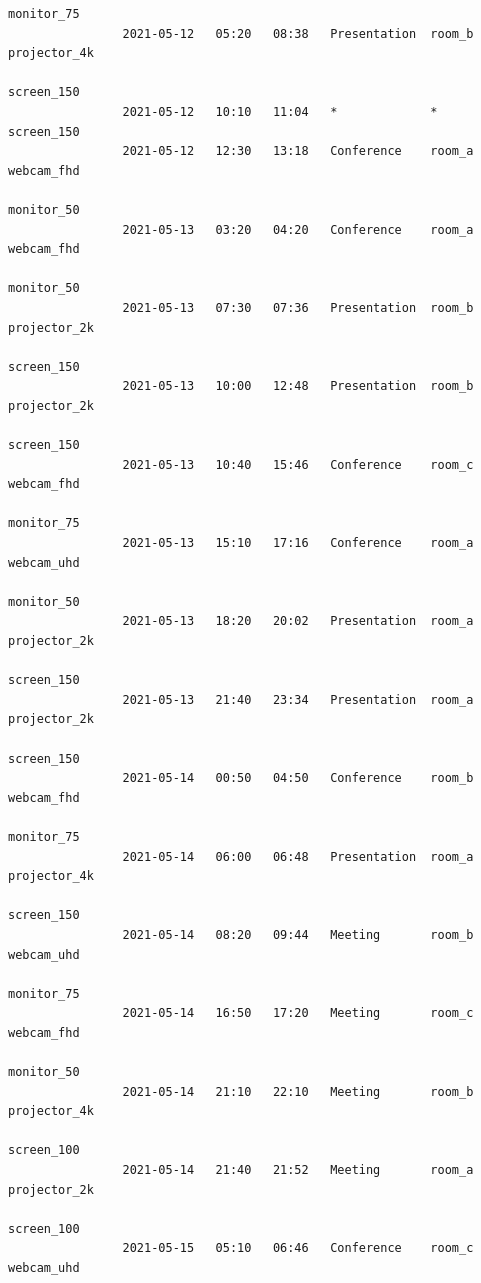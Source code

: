 \documentclass{article}
\begin{document}
\begin{Verbatim}[gobble=8]
                                                                    monitor_75
                2021-05-12   05:20   08:38   Presentation  room_b   projector_4k
                                                                    screen_150
                2021-05-12   10:10   11:04   *             *        screen_150
                2021-05-12   12:30   13:18   Conference    room_a   webcam_fhd
                                                                    monitor_50
                2021-05-13   03:20   04:20   Conference    room_a   webcam_fhd
                                                                    monitor_50
                2021-05-13   07:30   07:36   Presentation  room_b   projector_2k
                                                                    screen_150
                2021-05-13   10:00   12:48   Presentation  room_b   projector_2k
                                                                    screen_150
                2021-05-13   10:40   15:46   Conference    room_c   webcam_fhd
                                                                    monitor_75
                2021-05-13   15:10   17:16   Conference    room_a   webcam_uhd
                                                                    monitor_50
                2021-05-13   18:20   20:02   Presentation  room_a   projector_2k
                                                                    screen_150
                2021-05-13   21:40   23:34   Presentation  room_a   projector_2k
                                                                    screen_150
                2021-05-14   00:50   04:50   Conference    room_b   webcam_fhd
                                                                    monitor_75
                2021-05-14   06:00   06:48   Presentation  room_a   projector_4k
                                                                    screen_150
                2021-05-14   08:20   09:44   Meeting       room_b   webcam_uhd
                                                                    monitor_75
                2021-05-14   16:50   17:20   Meeting       room_c   webcam_fhd
                                                                    monitor_50
                2021-05-14   21:10   22:10   Meeting       room_b   projector_4k
                                                                    screen_100
                2021-05-14   21:40   21:52   Meeting       room_a   projector_2k
                                                                    screen_100
                2021-05-15   05:10   06:46   Conference    room_c   webcam_uhd

\end{Verbatim}
\end{document}
